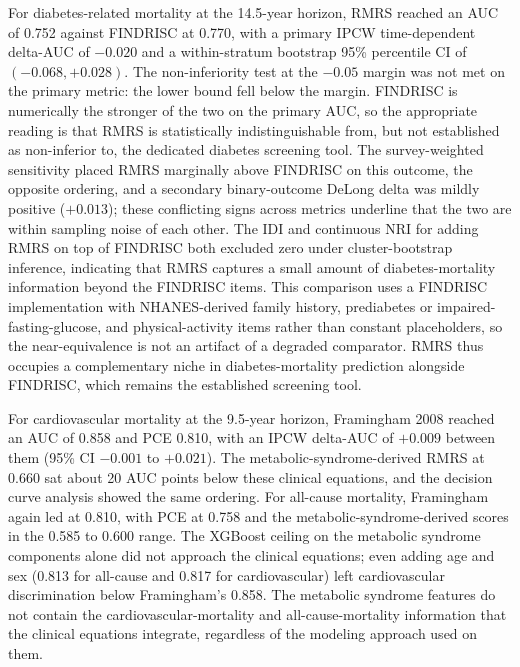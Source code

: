 \documentclass[11pt]{article}
\begin{document}
For diabetes-related mortality at the 14.5-year horizon, RMRS reached an AUC of 0.752 against FINDRISC at 0.770, with a primary IPCW time-dependent delta-AUC of $-0.020$ and a within-stratum bootstrap 95\% percentile CI of $(-0.068, +0.028)$. The non-inferiority test at the $-0.05$ margin was not met on the primary metric: the lower bound fell below the margin. FINDRISC is numerically the stronger of the two on the primary AUC, so the appropriate reading is that RMRS is statistically indistinguishable from, but not established as non-inferior to, the dedicated diabetes screening tool. The survey-weighted sensitivity placed RMRS marginally above FINDRISC on this outcome, the opposite ordering, and a secondary binary-outcome DeLong delta was mildly positive ($+0.013$); these conflicting signs across metrics underline that the two are within sampling noise of each other. The IDI and continuous NRI for adding RMRS on top of FINDRISC both excluded zero under cluster-bootstrap inference, indicating that RMRS captures a small amount of diabetes-mortality information beyond the FINDRISC items. This comparison uses a FINDRISC implementation with NHANES-derived family history, prediabetes or impaired-fasting-glucose, and physical-activity items rather than constant placeholders, so the near-equivalence is not an artifact of a degraded comparator. RMRS thus occupies a complementary niche in diabetes-mortality prediction alongside FINDRISC, which remains the established screening tool.

For cardiovascular mortality at the 9.5-year horizon, Framingham 2008 reached an AUC of 0.858 and PCE 0.810, with an IPCW delta-AUC of $+0.009$ between them (95\% CI $-0.001$ to $+0.021$). The metabolic-syndrome-derived RMRS at 0.660 sat about 20 AUC points below these clinical equations, and the decision curve analysis showed the same ordering. For all-cause mortality, Framingham again led at 0.810, with PCE at 0.758 and the metabolic-syndrome-derived scores in the 0.585 to 0.600 range. The XGBoost ceiling on the metabolic syndrome components alone did not approach the clinical equations; even adding age and sex (0.813 for all-cause and 0.817 for cardiovascular) left cardiovascular discrimination below Framingham's 0.858. The metabolic syndrome features do not contain the cardiovascular-mortality and all-cause-mortality information that the clinical equations integrate, regardless of the modeling approach used on them.
\end{document}
